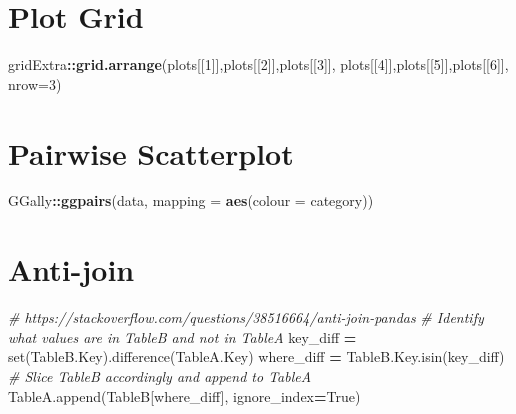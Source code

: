 \documentclass[]{book}
\newenvironment{Shaded}{\begin{snugshade}}{\end{snugshade}}
\newcommand{\BuiltInTok}[1]{#1}
\newcommand{\CommentTok}[1]{\textcolor[rgb]{0.56,0.35,0.01}{\textit{#1}}}
\newcommand{\DataTypeTok}[1]{\textcolor[rgb]{0.13,0.29,0.53}{#1}}
\newcommand{\DecValTok}[1]{\textcolor[rgb]{0.00,0.00,0.81}{#1}}
\newcommand{\KeywordTok}[1]{\textcolor[rgb]{0.13,0.29,0.53}{\textbf{#1}}}
\newcommand{\NormalTok}[1]{#1}
\newcommand{\OperatorTok}[1]{\textcolor[rgb]{0.81,0.36,0.00}{\textbf{#1}}}
\newcommand{\StringTok}[1]{\textcolor[rgb]{0.31,0.60,0.02}{#1}}
\newcommand{\VariableTok}[1]{\textcolor[rgb]{0.00,0.00,0.00}{#1}}
\begin{document}
\begin{Shaded}
\end{Shaded}

\hypertarget{plot-grid}{%
\section{Plot Grid}\label{plot-grid}}

\begin{Shaded}
\begin{Highlighting}[]
\NormalTok{gridExtra}\OperatorTok{::}\KeywordTok{grid.arrange}\NormalTok{(plots[[}\DecValTok{1}\NormalTok{]],plots[[}\DecValTok{2}\NormalTok{]],plots[[}\DecValTok{3}\NormalTok{]], plots[[}\DecValTok{4}\NormalTok{]],plots[[}\DecValTok{5}\NormalTok{]],plots[[}\DecValTok{6}\NormalTok{]], }\DataTypeTok{nrow=}\DecValTok{3}\NormalTok{)}
\end{Highlighting}
\end{Shaded}

\hypertarget{pairwise-scatterplot}{%
\section{Pairwise Scatterplot}\label{pairwise-scatterplot}}

\begin{Shaded}
\begin{Highlighting}[]
\NormalTok{GGally}\OperatorTok{::}\KeywordTok{ggpairs}\NormalTok{(data, }\DataTypeTok{mapping =} \KeywordTok{aes}\NormalTok{(}\DataTypeTok{colour =}\NormalTok{ category))}
\end{Highlighting}
\end{Shaded}

\hypertarget{anti-join}{%
\section{Anti-join}\label{anti-join}}

\begin{Shaded}
\begin{Highlighting}[]
\CommentTok{# https://stackoverflow.com/questions/38516664/anti-join-pandas}
\CommentTok{# Identify what values are in TableB and not in TableA}
\NormalTok{key_diff }\OperatorTok{=} \BuiltInTok{set}\NormalTok{(TableB.Key).difference(TableA.Key)}
\NormalTok{where_diff }\OperatorTok{=}\NormalTok{ TableB.Key.isin(key_diff)}
\CommentTok{# Slice TableB accordingly and append to TableA}
\NormalTok{TableA.append(TableB[where_diff], ignore_index}\OperatorTok{=}\VariableTok{True}\NormalTok{)}
\end{Highlighting}
\end{Shaded}
\end{document}
